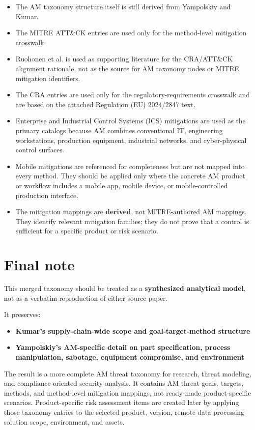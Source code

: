 \documentclass[10pt,a4paper,oneside]{report}
\begin{document}
\begin{itemize}
\item The AM taxonomy structure itself is still derived from Yampolskiy and Kumar.
\item The MITRE ATT\&CK entries are used only for the method-level mitigation crosswalk.
\item Ruohonen et al. is used as supporting literature for the CRA/ATT\&CK alignment rationale, not as the source for AM taxonomy nodes or MITRE mitigation identifiers.
\item The CRA entries are used only for the regulatory-requirements crosswalk and are based on the attached Regulation (EU) 2024/2847 text.
\item Enterprise and Industrial Control Systems (ICS) mitigations are used as the primary catalogs because AM combines conventional IT, engineering workstations, production equipment, industrial networks, and cyber-physical control surfaces.
\item Mobile mitigations are referenced for completeness but are not mapped into every method. They should be applied only where the concrete AM product or workflow includes a mobile app, mobile device, or mobile-controlled production interface.
\item The mitigation mappings are \textbf{derived}, not MITRE-authored AM mappings. They identify relevant mitigation families; they do not prove that a control is sufficient for a specific product or risk scenario.
\end{itemize}


\section{Final note}


This merged taxonomy should be treated as a \textbf{synthesized analytical model}, not as a verbatim reproduction of either source paper.

It preserves:

\begin{itemize}
\item \textbf{Kumar's supply-chain-wide scope and goal-target-method structure}
\item \textbf{Yampolskiy's AM-specific detail on part specification, process manipulation, sabotage, equipment compromise, and environment}
\end{itemize}

The result is a more complete AM threat taxonomy for research, threat modeling, and compliance-oriented security analysis. It contains AM threat goals, targets, methods, and method-level mitigation mappings, not ready-made product-specific scenarios. Product-specific risk assessment items are created later by applying those taxonomy entries to the selected product, version, remote data processing solution scope, environment, and assets.
\end{document}
